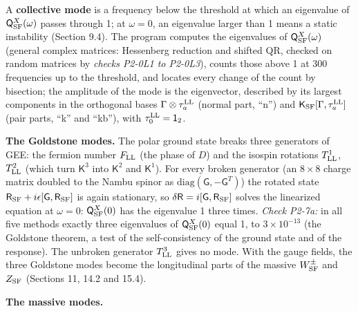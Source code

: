 \documentclass[
  10pt,
]{article}
\begin{document}
A \textbf{collective mode} is a frequency below the threshold at which
an eigenvalue of \(\mathsf Q^X_{\rm SF}(\omega)\) passes through 1; at
\(\omega=0\), an eigenvalue larger than 1 means a static instability
(Section 9.4). The program computes the eigenvalues of
\(\mathsf Q^X_{\rm SF}(\omega)\) (general complex matrices: Hessenberg
reduction and shifted QR, checked on random matrices by \emph{checks
P2-0L1 to P2-0L3}), counts those above 1 at 300 frequencies up to the
threshold, and locates every change of the count by bisection; the
amplitude of the mode is the eigenvector, described by its largest
components in the orthogonal bases \(\Gamma\otimes\tau^{\rm LL}_a\)
(normal part, ``n'') and \(\mathsf K_{\rm SF}[\Gamma,\tau^{\rm LL}_a]\)
(pair parts, ``k'' and ``kb''), with \(\tau^{\rm LL}_0=\mathsf 1_2\).

\textbf{The Goldstone modes.} The polar ground state breaks three
generators of GEE: the fermion number \(F_{\rm LL}\) (the phase of
\(D\)) and the isospin rotations \(T^1_{\rm LL}\), \(T^2_{\rm LL}\)
(which turn \(\mathsf K^3\) into \(\mathsf K^2\) and \(\mathsf K^1\)).
For every broken generator (an \(8\times8\) charge matrix doubled to the
Nambu spinor as \(\mathrm{diag}(\mathsf G,-\mathsf G^T)\)) the rotated
state \(\mathsf R_{\rm SF}+i\epsilon[\mathsf G,\mathsf R_{\rm SF}]\) is
again stationary, so \(\delta\mathsf R=i[\mathsf G,\mathsf R_{\rm SF}]\)
solves the linearized equation at \(\omega=0\):
\(\mathsf Q^X_{\rm SF}(0)\) has the eigenvalue 1 three times.
\emph{Check P2-7a:} in all five methods exactly three eigenvalues of
\(\mathsf Q^X_{\rm SF}(0)\) equal 1, to \(3\times10^{-13}\) (the
Goldstone theorem, a test of the self-consistency of the ground state
and of the response). The unbroken generator \(T^3_{\rm LL}\) gives no
mode. With the gauge fields, the three Goldstone modes become the
longitudinal parts of the massive \(W^\pm_{\rm SF}\) and \(Z_{\rm SF}\)
(Sections 11, 14.2 and 15.4).

\textbf{The massive modes.}
\end{document}
